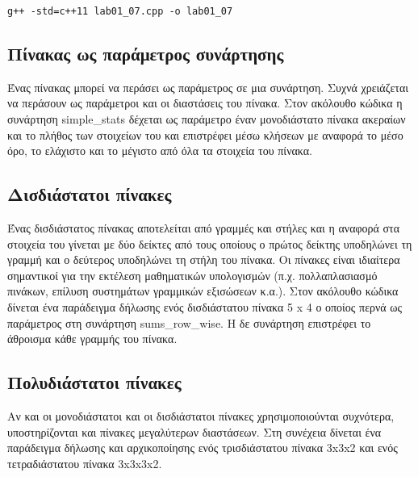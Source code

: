 \begin{lstlisting}[style=DOS]
g++ -std=c++11 lab01_07.cpp -o lab01_07
\end{lstlisting}

\subsection{Πίνακας ως παράμετρος συνάρτησης}
Ένας πίνακας μπορεί να περάσει ως παράμετρος σε μια συνάρτηση. Συχνά χρειάζεται να περάσουν ως παράμετροι και οι διαστάσεις του πίνακα. Στον ακόλουθο κώδικα η συνάρτηση simple\_stats δέχεται ως παράμετρο έναν μονοδιάστατο  πίνακα ακεραίων και το πλήθος των στοιχείων του και επιστρέφει μέσω κλήσεων με αναφορά το μέσο όρο, το ελάχιστο και το μέγιστο από όλα τα στοιχεία του πίνακα.





\subsection{Δισδιάστατοι πίνακες}
Ένας δισδιάστατος πίνακας αποτελείται από γραμμές και στήλες και η αναφορά στα στοιχεία του γίνεται με δύο  δείκτες από τους οποίους ο πρώτος δείκτης υποδηλώνει τη γραμμή και ο δεύτερος υποδηλώνει τη στήλη του πίνακα. Οι πίνακες είναι ιδιαίτερα σημαντικοί για την εκτέλεση μαθηματικών υπολογισμών (π.χ. πολλαπλασιασμό πινάκων, επίλυση συστημάτων γραμμικών εξισώσεων κ.α.). Στον ακόλουθο κώδικα δίνεται ένα παράδειγμα δήλωσης ενός δισδιάστατου πίνακα 5 x 4 ο οποίος περνά ως παράμετρος στη συνάρτηση sums\_row\_wise. Η δε συνάρτηση επιστρέφει το άθροισμα κάθε γραμμής του πίνακα.






\subsection{Πολυδιάστατοι πίνακες}
Αν και οι μονοδιάστατοι και οι δισδιάστατοι πίνακες χρησιμοποιούνται συχνότερα, υποστηρίζονται και πίνακες μεγαλύτερων διαστάσεων. Στη συνέχεια δίνεται ένα παράδειγμα δήλωσης και αρχικοποίησης ενός τρισδιάστατου πίνακα 3x3x2 και ενός τετραδιάστατου πίνακα 3x3x3x2.

